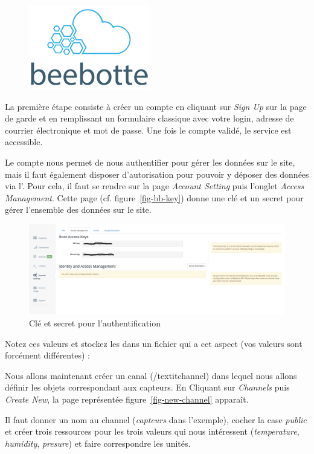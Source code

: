 \begin{figure}
\includegraphics[width=.2\columnwidth]{Pictures/beebotte.png}
\end{figure}

La première étape consiste à créer un compte en cliquant sur \textit{Sign Up} sur la page de garde et en remplissant un formulaire classique avec votre login, adresse de courrier électronique et mot de passe. Une fois le compte validé, le service est accessible.

Le compte nous permet de nous authentifier pour gérer les données sur le site, mais il faut également disposer d’autorisation pour pouvoir y déposer des données via l’. Pour cela, il faut se rendre sur la page \textit{Account Setting} puis l’onglet \textit{Access Management}. Cette page (cf. figure~\vref{fig-bb-key}) donne une clé et un secret pour gérer l’ensemble des données sur le site. 

\begin{figure}[tbp]
\centerline{\includegraphics[width=1\columnwidth]{Pictures/bb_root_token.png}}
\caption{Clé et secret pour l'authentification}
\label{fig-bb-key}
\end{figure}


Notez ces valeurs et stockez les dans un fichier  qui a cet aspect (vos valeurs sont forcément différentes) :





Nous allons maintenant créer un canal (/textit{channel}) dans lequel nous allons définir les objets correspondant aux capteurs. En Cliquant sur \textit {Channels} puis \textit{Create New}, la page représentée figure~\vref{fig-new-channel} apparaît. 

Il faut donner un nom au channel (\textit{capteurs} dans l'exemple), cocher la case \textit{public} et créer trois ressources pour les trois valeurs qui nous intéressent (\textit{temperature}, \textit{humidity}, \textit{presure}) et faire correspondre les unités.



